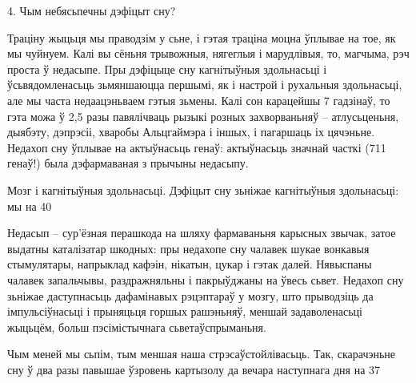 4. Чым небясьпечны дэфіцыт сну?

Траціну жыцьця мы праводзім у сьне, і гэтая траціна моцна ўплывае на тое, як мы чуйнуем. Калі вы сёньня трывожныя, нягеглыя і марудлівыя, то, магчыма, рэч проста ў недасыпе. Пры дэфіцыце сну кагнітыўныя здольнасьці і ўсьвядомленасьць зьмяншаюцца першымі, як і настрой і рухальныя здольнасьці, але мы часта недаацэньваем гэтыя зьмены. Калі сон карацейшы 7 гадзінаў, то гэта можа ў 2,5 разы павялічваць рызыкі розных захворваньняў – атлусьценьня, дыябэту, дэпрэсіі, хваробы Альцгаймэра і іншых, і пагаршаць іх цячэньне. Недахоп сну ўплывае на актыўнасьць генаў: актыўнасьць значнай часткі (711 генаў!) была дэфармаваная з прычыны недасыпу.

Мозг і кагнітыўныя здольнасьці. Дэфіцыт сну зьніжае кагнітыўныя здольнасьці: мы на 40%

Недасып – сур'ёзная перашкода на шляху фармаваньня карысных звычак, затое выдатны каталізатар шкодных: пры недахопе сну чалавек шукае вонкавыя стымулятары, напрыклад кафэін, нікатын, цукар і гэтак далей. Нявыспаны чалавек запальчывы, раздражняльны і пакрыўджаны на ўвесь сьвет. Недахоп сну зьніжае даступнасьць дафамінавых рэцэптараў у мозгу, што прыводзіць да імпульсіўнасьці і прыняцьця горшых рашэньняў, меншай задаволенасьці жыцьцём, больш пэсімістычнага сьветаўспрыманьня.

Чым меней мы сьпім, тым меншая наша стрэсаўстойлівасьць. Так, скарачэньне сну ў два разы павышае ўзровень картызолу да вечара наступнага дня на 37%

